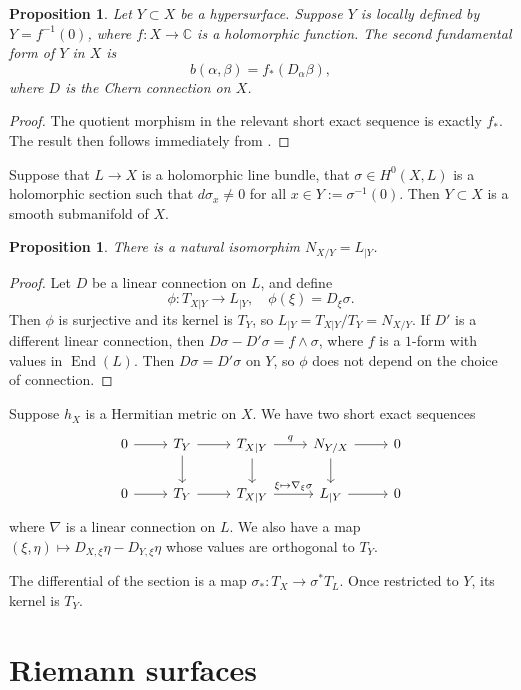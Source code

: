 \documentclass[10pt,a4paper]{article}
\newtheorem{prop}[theo]{Proposition}
\newtheorem*{proof}{Proof}
\newcommand{\kk}[1]{\mathbb{#1}}
\DeclareMathOperator{\End}{End}
\begin{document}
\begin{prop}
Let $Y \subset X$ be a hypersurface. Suppose $Y$ is locally defined by $Y = f^{-1}(0)$, where $f : X \to \kk C$ is a holomorphic function. The second fundamental form of $Y$ in $X$ is
\[
b(\alpha,\beta) = f_*(D_\alpha \beta),
\]
where $D$ is the Chern connection on $X$.
\end{prop}

\begin{proof}
The quotient morphism in the relevant short exact sequence is exactly $f_*$. The result then follows immediately from .
\end{proof}


Suppose that $L \to X$ is a holomorphic line bundle, that $\sigma \in H^0(X,L)$ is a holomorphic section such that $d\sigma_x \not= 0$ for all $x \in Y := \sigma^{-1}(0)$. Then $Y \subset X$ is a smooth submanifold of $X$.

\begin{prop}
There is a natural isomorphim $N_{X/Y} = L_{|Y}$.
\end{prop}

\begin{proof}
Let $D$ be a linear connection on $L$, and define
\[
\phi : T_{X|Y} \to L_{|Y},
\quad
\phi(\xi) = D_\xi \sigma.
\]
Then $\phi$ is surjective and its kernel is $T_Y$, so $L_{|Y} = T_{X|Y} / T_Y = N_{X/Y}$. If $D'$ is a different linear connection, then $D\sigma - D'\sigma = f \wedge \sigma$, where $f$ is a $1$-form with values in $\End(L)$. Then $D\sigma = D'\sigma$ on $Y$, so $\phi$ does not depend on the choice of connection.
\end{proof}

Suppose $h_X$ is a Hermitian metric on $X$. We have two short exact sequences
\[
\begin{tikzcd}
0 \ar[r] & T_Y \ar[r]\ar[d] & T_{X|Y} \ar[d] \ar[r,"q"] & N_{Y/X} \ar[r] \ar[d] & 0
\\
0 \ar[r] & T_Y \ar[r] & T_{X|Y} \ar[r,"\xi \mapsto \nabla_\xi\sigma"] & L_{|Y} \ar[r] & 0
\end{tikzcd}
\]
where $\nabla$ is a linear connection on $L$. We also have a map $(\xi,\eta) \mapsto D_{X,\xi}\eta - D_{Y,\xi}\eta$ whose values are orthogonal to $T_Y$.

The differential of the section is a map $\sigma_* : T_X \to \sigma^* T_L$. Once restricted to $Y$, its kernel is $T_Y$.



\section{Riemann surfaces}
\label{sec:org776713b}
\end{document}
